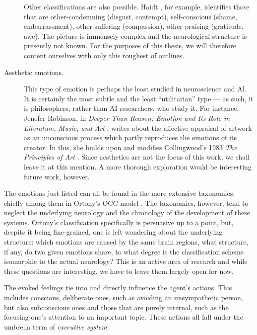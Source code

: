 \begin{description}
	Other classifications are also possible. Haidt \cite{haidt2003}, for example, identifies those that are other-condemning (disgust, contempt), self-conscious (shame, embarrassment), other-suffering (compassion), other-praising (gratitude, awe). The picture is immensely complex and the neurological structure is presently not known. For the purposes of this thesis, we will therefore content ourselves with only this roughest of outlines.
	
	\item[Aesthetic emotions.] This type of emotion is perhaps the least studied in neuroscience and AI. It is certainly the most subtle and the least ``utilitarian'' type --- as such, it is philosophers, rather than AI researchers, who study it. For instance, Jenefer Robinson, in {\em Deeper Than Reason: Emotion and Its Role in Literature, Music, and Art} \cite{robinson2005}, writes about the affective appraisal of artwork as an unconscious process which partly reproduces the emotions of its creator. In this, she builds upon and modifies Collingwood's 1983 {\em The Principles of Art} \cite{collingwood1938, SEPcollingwood}. Since aesthetics are not the focus of this work, we shall leave it at this mention. A more thorough exploration would be interesting future work, however.
\end{description}

The emotions just listed can all be found in the more extensive taxonomies, chiefly among them in Ortony's OCC model \cite{ortony1988}. The taxonomies, however, tend to neglect the underlying neurology and the chronology of the development of these systems. Ortony's classification specifically is persuasive up to a point, but, despite it being fine-grained, one is left wondering about the underlying structure: which emotions are caused by the same brain regions, what structure, if any, do two given emotions share, to what degree is the classification scheme isomorphic to the actual neurology? This is an active area of research and while these questions are interesting, we have to leave them largely open for now.

The evoked feelings tie into and directly influence the agent's actions. This includes conscious, deliberate ones, such as avoiding an unsympathetic person, but also subconscious ones and those that are purely internal, such as the focusing one's attention to an important topic. These actions all fall under the umbrella term of {\em executive system}:

